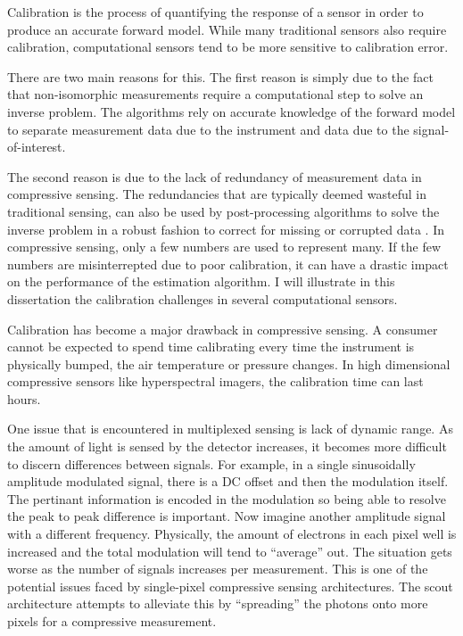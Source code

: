 Calibration is the process of quantifying the response of a sensor in order to produce an accurate forward model. While many traditional sensors also require calibration, computational sensors tend to be more sensitive to calibration error. 

There are two main reasons for this. The first reason is simply due to the fact that non-isomorphic measurements require a computational step to solve an inverse problem. The algorithms rely on accurate knowledge of the forward model to separate measurement data due to the instrument and data due to the signal-of-interest. 

The second reason is due to the lack of redundancy of measurement data in compressive sensing. The redundancies that are typically deemed wasteful in traditional sensing, can also be used by post-processing algorithms to solve the inverse problem in a robust fashion to correct for missing or corrupted data \cite{gehm2013calibration}. In \gls{compressive sensing}, only a few numbers are used to represent many. If the few numbers are misinterrepted due to poor calibration, it can have a drastic impact on the performance of the estimation algorithm. I will illustrate in this dissertation the calibration challenges in several computational sensors. 

Calibration has become a major drawback in compressive sensing. A consumer cannot be expected to spend time calibrating every time the instrument is physically bumped, the air temperature or pressure changes. In high dimensional compressive sensors like hyperspectral imagers, the calibration time can last hours.

One issue that is encountered in multiplexed sensing is lack of dynamic range. As the amount of light is sensed by the detector increases, it becomes more difficult to discern differences between signals. For example, in a single sinusoidally amplitude modulated signal, there is a DC offset and then the modulation itself. The pertinant information is encoded in the modulation so being able to resolve the peak to peak difference is important. Now imagine another amplitude signal with a different frequency. Physically, the amount of electrons in each pixel well is increased and the total modulation will tend to ``average'' out. The situation gets worse as the number of signals increases per measurement. This is one of the potential issues faced by single-pixel compressive sensing architectures. The \gls{scout} architecture attempts to alleviate this by ``spreading'' the photons onto more pixels for a compressive measurement. 

